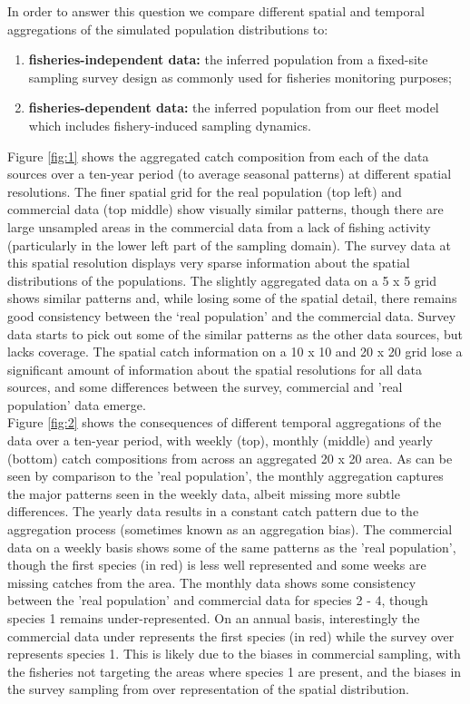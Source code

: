 \documentclass[review]{elsarticle}
\begin{document}
In order to answer this question we compare different spatial and temporal
aggregations of the simulated population distributions to:
\begin{enumerate}[label=\alph*)]
	\item \textbf{fisheries-independent data:} the inferred population from
		a fixed-site sampling survey design as commonly used for
		fisheries monitoring purposes;
	\item \textbf{fisheries-dependent data:} the inferred population from
		our fleet model which includes fishery-induced sampling
		dynamics.
\end{enumerate}

Figure \ref{fig:1} shows the aggregated catch composition from each of the data
sources over a ten-year period (to average seasonal patterns) at different
spatial resolutions. The finer spatial grid for the real population (top left)
and commercial data (top middle) show visually similar patterns, though there
are large unsampled areas in the commercial data from a lack of fishing
activity (particularly in the lower left part of the sampling domain). The
survey data at this spatial resolution displays very sparse information about
the spatial distributions of the populations. The slightly aggregated data on a
5 x 5 grid shows similar patterns and, while losing some of the spatial detail,
there remains good consistency between the `real population' and the commercial
data. Survey data starts to pick out some of the similar patterns as the other
data sources, but lacks coverage. The spatial catch information on a 10 x 10
and 20 x 20 grid lose a significant amount of information about the spatial
resolutions for all data sources, and some differences between the survey,
commercial and 'real population' data emerge. \\

Figure \ref{fig:2} shows the consequences of different temporal aggregations of
the data over a ten-year period, with weekly (top), monthly (middle) and yearly
(bottom) catch compositions from across an aggregated 20 x 20 area. As can be
seen by comparison to the 'real population', the monthly aggregation captures
the major patterns seen in the weekly data, albeit missing more subtle
differences. The yearly data results in a constant catch pattern due to the
aggregation process (sometimes known as an aggregation bias). The commercial
data on a weekly basis shows some of the same patterns as the 'real
population', though the first species (in red) is less well represented and
some weeks are missing catches from the area. The monthly data shows some
consistency between the 'real population' and commercial data for species 2 -
4, though species 1 remains under-represented. On an annual basis,
interestingly the commercial data under represents the first species (in red)
while the survey over represents species 1. This is likely due to the biases in
commercial sampling, with the fisheries not targeting the areas where species 1
are present, and the biases in the survey sampling from over representation of
the spatial distribution. 
\end{document}

